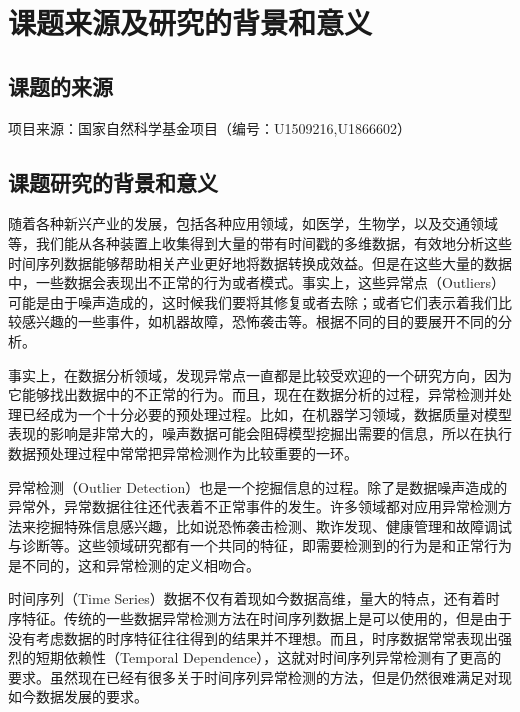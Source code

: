 \section{课题来源及研究的背景和意义}

\subsection{课题的来源}

项目来源：国家自然科学基金项目（编号：U1509216,U1866602）

\subsection{课题研究的背景和意义}

随着各种新兴产业的发展，包括各种应用领域，如医学，生物学，以及交通领域等，我们能从各种装置上收集得到大量的带有时间戳的多维数据，有效地分析这些时间序列数据能够帮助相关产业更好地将数据转换成效益。但是在这些大量的数据中，一些数据会表现出不正常的行为或者模式。事实上，这些异常点（Outliers）可能是由于噪声造成的，这时候我们要将其修复或者去除；或者它们表示着我们比较感兴趣的一些事件，如机器故障，恐怖袭击等。根据不同的目的要展开不同的分析\cite{koufakou2010fast}。

事实上，在数据分析领域，发现异常点一直都是比较受欢迎的一个研究方向，因为它能够找出数据中的不正常的行为。而且，现在在数据分析的过程，异常检测并处理已经成为一个十分必要的预处理过程\cite{ha2014robust}。比如，在机器学习领域，数据质量对模型表现的影响是非常大的，噪声数据可能会阻碍模型挖掘出需要的信息，所以在执行数据预处理过程中常常把异常检测作为比较重要的一环\cite{zhang2017time}。

异常检测（Outlier Detection）也是一个挖掘信息的过程。除了是数据噪声造成的异常外，异常数据往往还代表着不正常事件的发生。许多领域都对应用异常检测方法来挖掘特殊信息感兴趣，比如说恐怖袭击检测\cite{riffo2015automated}、欺诈发现、健康管理和故障调试与诊断\cite{allen2011anomaly}等。这些领域研究都有一个共同的特征，即需要检测到的行为是和正常行为是不同的，这和异常检测的定义相吻合。

时间序列（Time Series）数据不仅有着现如今数据高维，量大\cite{budalakoti2006anomaly}的特点，还有着时序特征。传统的一些数据异常检测方法在时间序列数据上是可以使用的，但是由于没有考虑数据的时序特征往往得到的结果并不理想。而且，时序数据常常表现出强烈的短期依赖性（Temporal Dependence）\cite{cai2018effective}，这就对时间序列异常检测有了更高的要求。虽然现在已经有很多关于时间序列异常检测的方法，但是仍然很难满足对现如今数据发展的要求。

